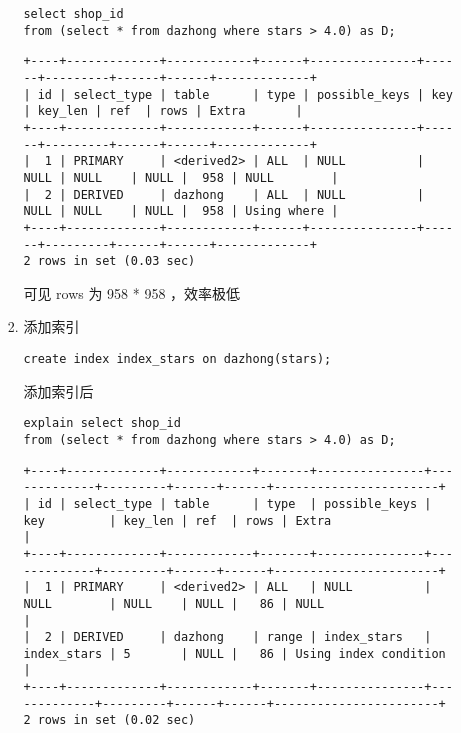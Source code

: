 \documentclass[11pt]{article}
\begin{document}
\begin{itemize}
\begin{enumerate}
\begin{enumerate}
\begin{lstlisting}
select shop_id
from (select * from dazhong where stars > 4.0) as D;
\end{lstlisting}

\begin{verbatim}
+----+-------------+------------+------+---------------+------+---------+------+------+-------------+
| id | select_type | table      | type | possible_keys | key  | key_len | ref  | rows | Extra       |
+----+-------------+------------+------+---------------+------+---------+------+------+-------------+
|  1 | PRIMARY     | <derived2> | ALL  | NULL          | NULL | NULL    | NULL |  958 | NULL        |
|  2 | DERIVED     | dazhong    | ALL  | NULL          | NULL | NULL    | NULL |  958 | Using where |
+----+-------------+------------+------+---------------+------+---------+------+------+-------------+
2 rows in set (0.03 sec)
\end{verbatim}

可见 rows 为 958 * 958 ，效率极低

\item 添加索引

\begin{lstlisting}
create index index_stars on dazhong(stars);
\end{lstlisting}

添加索引后

\begin{lstlisting}
explain select shop_id
from (select * from dazhong where stars > 4.0) as D;
\end{lstlisting}

\begin{verbatim}
+----+-------------+------------+-------+---------------+-------------+---------+------+------+-----------------------+
| id | select_type | table      | type  | possible_keys | key         | key_len | ref  | rows | Extra                 |
+----+-------------+------------+-------+---------------+-------------+---------+------+------+-----------------------+
|  1 | PRIMARY     | <derived2> | ALL   | NULL          | NULL        | NULL    | NULL |   86 | NULL                  |
|  2 | DERIVED     | dazhong    | range | index_stars   | index_stars | 5       | NULL |   86 | Using index condition |
+----+-------------+------------+-------+---------------+-------------+---------+------+------+-----------------------+
2 rows in set (0.02 sec)
\end{verbatim}


\end{enumerate}
\end{enumerate}
\end{itemize}
\end{document}
